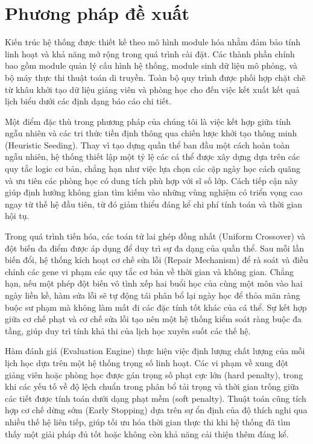 \section{Phương pháp đề xuất}

Kiến trúc hệ thống được thiết kế theo mô hình module hóa nhằm đảm bảo tính linh hoạt và khả năng mở rộng trong quá trình cài đặt. Các thành phần chính bao gồm module quản lý cấu hình hệ thống, module sinh dữ liệu mô phỏng, và bộ máy thực thi thuật toán di truyền. Toàn bộ quy trình được phối hợp chặt chẽ từ khâu khởi tạo dữ liệu giảng viên và phòng học cho đến việc kết xuất kết quả lịch biểu dưới các định dạng báo cáo chi tiết.

Một điểm đặc thù trong phương pháp của chúng tôi là việc kết hợp giữa tính ngẫu nhiên và các tri thức tiền định thông qua chiến lược khởi tạo thông minh (Heuristic Seeding). Thay vì tạo dựng quần thể ban đầu một cách hoàn toàn ngẫu nhiên, hệ thống thiết lập một tỷ lệ các cá thể được xây dựng dựa trên các quy tắc logic cơ bản, chẳng hạn như việc lựa chọn các cặp ngày học cách quãng và ưu tiên các phòng học có dung tích phù hợp với sĩ số lớp. Cách tiếp cận này giúp định hướng không gian tìm kiếm vào những vùng nghiệm có triển vọng cao ngay từ thế hệ đầu tiên, từ đó giảm thiểu đáng kể chi phí tính toán và thời gian hội tụ.

Trong quá trình tiến hóa, các toán tử lai ghép đồng nhất (Uniform Crossover) và đột biến đa điểm được áp dụng để duy trì sự đa dạng của quần thể. Sau mỗi lần biến đổi, hệ thống kích hoạt cơ chế sửa lỗi (Repair Mechanism) để rà soát và điều chỉnh các gene vi phạm các quy tắc cơ bản về thời gian và không gian. Chẳng hạn, nếu một phép đột biến vô tình xếp hai buổi học của cùng một môn vào hai ngày liền kề, hàm sửa lỗi sẽ tự động tái phân bổ lại ngày học để thỏa mãn ràng buộc sư phạm mà không làm mất đi các đặc tính tốt khác của cá thể. Sự kết hợp giữa cơ chế phạt và cơ chế sửa lỗi tạo nên một hệ thống kiểm soát ràng buộc đa tầng, giúp duy trì tính khả thi của lịch học xuyên suốt các thế hệ.

Hàm đánh giá (Evaluation Engine) thực hiện việc định lượng chất lượng của mỗi lịch học dựa trên một hệ thống trọng số linh hoạt. Các vi phạm về xung đột giảng viên hoặc phòng học được gán trọng số phạt cực lớn (hard penalty), trong khi các yếu tố về độ lệch chuẩn trong phân bổ tải trọng và thời gian trống giữa các tiết được tính toán dưới dạng phạt mềm (soft penalty). Thuật toán cũng tích hợp cơ chế dừng sớm (Early Stopping) dựa trên sự ổn định của độ thích nghi qua nhiều thế hệ liên tiếp, giúp tối ưu hóa thời gian thực thi khi hệ thống đã tìm thấy một giải pháp đủ tốt hoặc không còn khả năng cải thiện thêm đáng kể.
